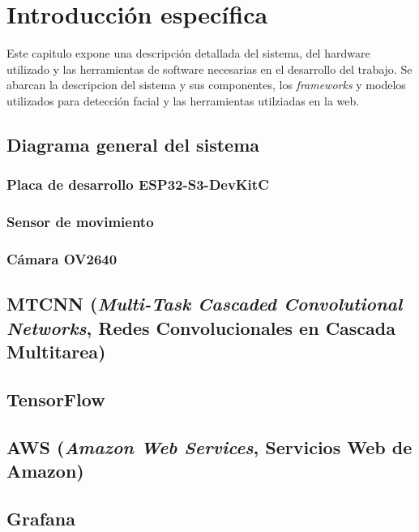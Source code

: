 \chapter{Introducción específica} %

\label{Chapter2}

Este capitulo expone una descripción detallada del sistema, del hardware utilizado y las herramientas de  software necesarias en el desarrollo del trabajo. Se abarcan la descripcion del sistema y sus componentes, los \textit{frameworks} y modelos utilizados para detección facial y las herramientas utilziadas en la web.

\section{Diagrama general del sistema}

\subsection{Placa de desarrollo ESP32-S3-DevKitC}

\subsection{Sensor de movimiento}

\subsection{Cámara OV2640}

\section{MTCNN (\textit{Multi-Task Cascaded Convolutional Networks}, Redes Convolucionales en Cascada Multitarea)}

\section{TensorFlow}

\section{AWS (\textit{Amazon Web Services}, Servicios Web de Amazon)}

\section{Grafana}
